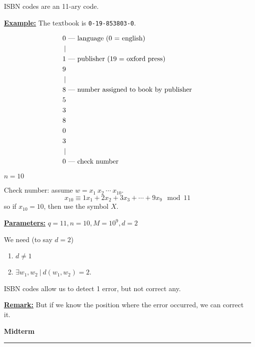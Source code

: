 \documentclass{article}
\newcommand{\header}[1]{
	\begin{Large}
	\noindent\textbf{#1}
	\vspace{2pt}
	\hrule
	\vspace{16pt}
	\end{Large}
	\normalsize
}
\renewcommand{\b}[1]{\textbf{#1}}
\newcommand{\ul}[1]{\underline{#1}}
\newcommand{\dash}{\textnormal{ \textemdash}}
\renewcommand{\aligned}[1]{
	\begin{align*}
		#1
	\end{align*}
}
\newcommand{\newdef}[2]{\b{\ul{#1:}} #2}
\begin{document}
ISBN codes are an 11-ary code.

\newdef{Example}{
	The textbook is \texttt{0-19-853803-0}.
	\aligned{
		0 & \dash \textnormal{ language (0 = english)}               \\
		| &                                                          \\
		1 & \dash \textnormal{ publisher (19 = oxford press)}        \\
		9 &                                                          \\
		| &                                                          \\
		8 & \dash \textnormal{ number assigned to book by publisher} \\
		5 &                                                          \\
		3 &                                                          \\
		8 &                                                          \\
		0 &                                                          \\
		3 &                                                          \\
		| &                                                          \\
		0 & \dash \textnormal{ check number}                         \\
	}
	$n = 10$

	Check number: assume $w = x_1\ x_2\ \cdots\ x_{10}$.
	\[
		x_{10} \equiv 1x_1 + 2x_2 + 3x_3 + \cdots + 9x_9 \mod 11
	\]
	so if $x_{10} = 10$, then use the symbol $X$.
}

\newdef{Parameters}{$q = 11, n = 10, M = 10^9, d = 2$}

We need (to say $d = 2$)
\begin{enumerate}
	\item $d \neq 1$
	\item $\exists w_1, w_2\ |\ d(w_1, w_2) = 2$.
\end{enumerate}

ISBN codes allow us to detect 1 error, but not correct any.

\newdef{Remark}{
	But if we know the position where the error occurred, we can correct
	it.
}

\header{Midterm}
\end{document}
